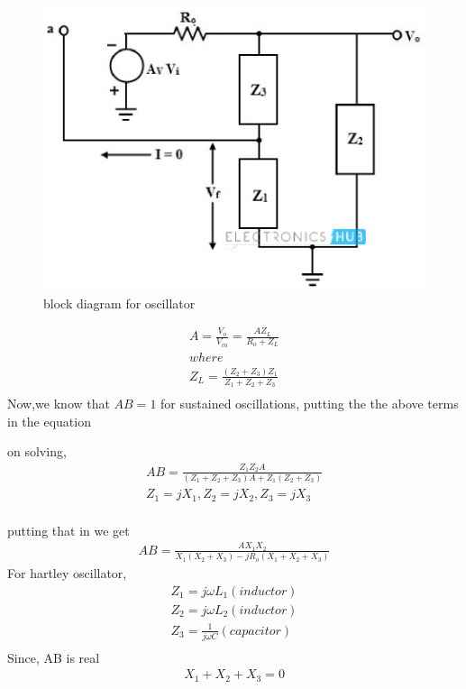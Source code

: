 \begin{enumerate}[label=\thesection.\arabic*.,ref=\thesection.\theenumi]
\begin{figure}[!ht]
\begin{center}
		\includegraphics[width=\columnwidth]{./figs/ee18btech11019/lc.eps}
	\end{center}
\caption{block diagram for oscillator}
\label{fig:ee18btech11019_block2}
\end{figure}
\begin{align}
    A = \frac{V_o}{V_{in}} = \frac{AZ_L}{R_o + Z_L}\\
    where\\
    Z_L = \frac{(Z_2 + Z_3)Z_1}{Z_1+Z_2+Z_3}\\
\end{align}
Now,we know that $AB = 1$ for sustained oscillations, putting the the above terms in the equation

    on solving,\\
\begin{align}    
    AB = \frac{Z_1Z_2A}{(Z_1+Z_2+Z_3)A+ Z_1(Z_2+Z_3)}\\
    Z_1 = jX_1,
    Z_2 = jX_2,
    Z_3 = jX_3\\
\end{align}    

    putting that in we get\\
\begin{align}
AB = \frac{AX_1X_2}{X_1(X_2+X_3) -jR_o(X_1+X_2+X_3)}
\end{align}
For hartley oscillator, 
\begin{align}
    Z_1 = j\omega L_1 (inductor)\\
    Z_2 = j\omega L_2 (inductor)\\
    Z_3 = \frac{1}{j\omega C} (capacitor)\\
\end{align}
Since, AB is real
\begin{align}
    X_1+X_2+X_3 = 0\\
\end{align}


\end{enumerate}
